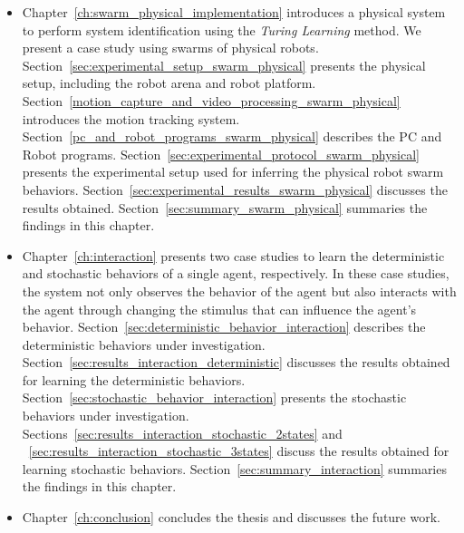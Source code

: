 \begin{itemize}
\item Chapter~\ref{ch:swarm_physical_implementation} introduces a physical system to perform system identification using the \textit{Turing Learning} method. We present a case study using swarms of physical robots. Section~\ref{sec:experimental_setup_swarm_physical} presents the physical setup, including the robot arena and robot platform. Section~\ref{motion_capture_and_video_processing_swarm_physical} introduces the motion tracking system. Section~\ref{pc_and_robot_programs_swarm_physical} describes the PC and Robot programs. Section~\ref{sec:experimental_protocol_swarm_physical} presents the experimental setup used for inferring the physical robot swarm behaviors. Section~\ref{sec:experimental_results_swarm_physical} discusses the results obtained. Section~\ref{sec:summary_swarm_physical} summaries the findings in this chapter.

\item Chapter~\ref{ch:interaction} presents two case studies to learn the deterministic and stochastic behaviors of a single agent, respectively. In these case studies, the system not only observes the behavior of the agent but also interacts with the agent through changing the stimulus that can influence the agent's behavior. Section~\ref{sec:deterministic_behavior_interaction} describes the deterministic behaviors under investigation. Section~\ref{sec:results_interaction_deterministic} discusses the results obtained for learning the deterministic behaviors. Section~\ref{sec:stochastic_behavior_interaction} presents the stochastic behaviors under investigation. Sections~\ref{sec:results_interaction_stochastic_2states} and ~\ref{sec:results_interaction_stochastic_3states} discuss the results obtained for learning stochastic behaviors. Section~\ref{sec:summary_interaction} summaries the findings in this chapter.

\item Chapter~\ref{ch:conclusion} concludes the thesis and discusses the future work. 

\end{itemize}
